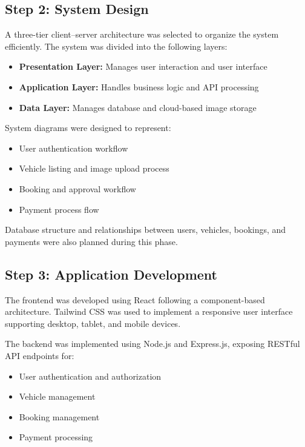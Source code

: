 \documentclass[12pt,a4paper]{report}
\begin{document}
\subsection{Step 2: System Design}

A three-tier client–server architecture was selected to organize the system efficiently. The system was divided into the following layers:

\begin{itemize}
	\item \textbf{Presentation Layer:} Manages user interaction and user interface
	\item \textbf{Application Layer:} Handles business logic and API processing
	\item \textbf{Data Layer:} Manages database and cloud-based image storage
\end{itemize}

System diagrams were designed to represent:
\begin{itemize}
	\item User authentication workflow
	\item Vehicle listing and image upload process
	\item Booking and approval workflow
	\item Payment process flow
\end{itemize}

Database structure and relationships between users, vehicles, bookings, and payments were also planned during this phase.

\subsection{Step 3: Application Development}

The frontend was developed using React\cite{react} following a component-based architecture. Tailwind CSS\cite{tailwind} was used to implement a responsive user interface supporting desktop, tablet, and mobile devices.

The backend was implemented using Node.js\cite{node} and Express.js\cite{express}, exposing RESTful API\cite{rest} endpoints for:
\begin{itemize}
	\item User authentication and authorization
	\item Vehicle management
	\item Booking management
	\item Payment processing
\end{itemize}
\end{document}
